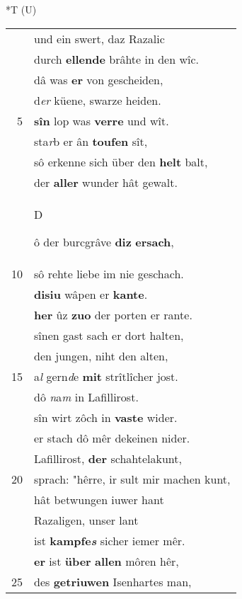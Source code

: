 \documentclass[8pt,a4paper,notitlepage]{article}
\begin{document}
\begin{table}[ht]
\begin{minipage}[t]{0.5\linewidth}
\end{minipage}
\hspace{0.5cm}
\begin{minipage}[t]{0.5\linewidth}
\small
\begin{center}*T (U)
\end{center}
\begin{tabular}{rl}
 & und ein swert, daz Razalic\\ 
 & durch \textbf{ellende} brâhte in den wîc.\\ 
 & dâ was \textbf{er} von gescheiden,\\ 
 & d\textit{er} küene, swarze heiden.\\ 
5 & \textbf{sîn} lop was \textbf{verre} und wît.\\ 
 & sta\textit{r}b er ân \textbf{toufen} sît,\\ 
 & sô erkenne sich über den \textbf{helt} balt,\\ 
 & der \textbf{aller} wunder hât gewalt.\\ 
 & \begin{large}D\end{large}ô der burcgrâve \textbf{diz} \textbf{ersach},\\ 
10 & sô rehte liebe im nie geschach.\\ 
 & \textbf{disiu} wâpen er \textbf{kante}.\\ 
 & \textbf{her} ûz \textbf{zuo} der porten er rante.\\ 
 & sînen gast sach er dort halten,\\ 
 & den jungen, niht den alten,\\ 
15 & a\textit{l} gern\textit{d}e \textbf{mit} strîtlîcher jost.\\ 
 & dô \textit{n}a\textit{m} in Lafillirost.\\ 
 & sîn wirt zôch in \textbf{vaste} wider.\\ 
 & er stach dô mêr dekeinen nider.\\ 
 & Lafillirost, \textbf{der} schahtelakunt,\\ 
20 & sprach: "hêrre, ir sult mir machen kunt,\\ 
 & hât betwungen iuwer hant\\ 
 & Razaligen, unser lant\\ 
 & ist \textbf{kampfe\textit{s}} sicher iemer mêr.\\ 
 & \textbf{er} ist \textbf{über} \textbf{allen} môren hêr,\\ 
25 & des \textbf{getriuwen} Isenhartes man,\\ 

\end{tabular}
\end{minipage}
\end{table}
\end{document}
